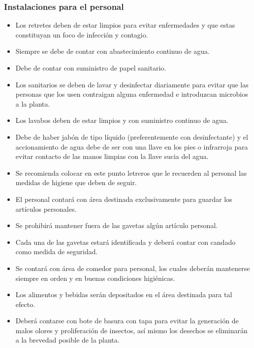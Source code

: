 \subsubsection{Instalaciones para el personal}
\begin{itemize}
	\item Los retretes deben de estar limpios para evitar enfermedades y que estas constituyan un foco de infección y contagio.
	\item Siempre se debe de contar con abastecimiento continuo de agua.
	\item Debe de contar con suministro de papel sanitario.
	\item Los sanitarios se deben de lavar y desinfectar diariamente para evitar que las personas que los usen contraigan alguna enfermedad e introduzcan microbios a la planta.
	\item Los lavabos deben de estar limpios y con suministro continuo de agua.
	\item Debe de haber jabón de tipo líquido (preferentemente con desinfectante) y el accionamiento de agua debe de ser con una llave en los pies o infrarroja para evitar contacto de las manos limpias con la llave sucia del agua.
	\item Se recomienda colocar en este punto letreros que le recuerden al personal las medidas de higiene que deben de seguir.
	\item El personal contará con área destinada exclusivamente para guardar los artículos personales.
	\item Se prohibirá mantener fuera de las gavetas algún artículo personal.
	\item Cada una de las gavetas estará identificada y deberá contar con candado como medida de seguridad.
	\item Se contará con área de comedor para personal, los cuales deberán mantenerse siempre en orden y en buenas condiciones higiénicas.
	\item Los alimentos y bebidas serán depositados en el área destinada para tal efecto.
	\item Deberá contarse con bote de basura con tapa para evitar la generación de malos olores y proliferación de insectos, así mismo los desechos se eliminarán a la brevedad posible de la planta.
\end{itemize}

